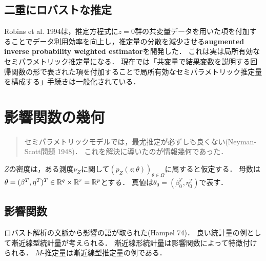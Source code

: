 \documentclass[uplatex,dvipdfmx]{jsreport}
\begin{document}
\section{二重にロバストな推定}

\begin{tcolorbox}[colframe=ForestGreen, colback=ForestGreen!10!white,breakable,colbacktitle=ForestGreen!40!white,coltitle=black,fonttitle=\bfseries\sffamily,
title=]
    Robins et al. 1994は，推定方程式に$z=0$群の共変量データを用いた項を付加することでデータ利用効率を向上し，推定量の分散を減少させる\textbf{augmented inverse probability weighted estimator}を開発した．
    これは実は局所有効なセミパラメトリック推定量になる．
    現在では「共変量で結果変数を説明する回帰関数の形で表された項を付加することで局所有効なセミパラメトリック推定量を構成する」手続きは一般化されている．
\end{tcolorbox}

\chapter{影響関数の幾何}

\begin{quotation}
    セミパラメトリックモデルでは，最尤推定が必ずしも良くない(Neyman-Scott問題 1948)．
    これを解決に導いたのが情報幾何であった．
\end{quotation}

\begin{notation}
    $Z$の密度は，ある測度$\nu_Z$に関して$(p_Z(z;\theta))_{\theta\in\Omega}$に属すると仮定する．
    母数は$\theta=(\beta^T,\eta^T)^T\in\mathbb{R}^q\times\mathbb{R}^r=\mathbb{R}^p$とする．
    真値は$\theta_0=(\beta_0^T,\eta^T_0)$で表す．
\end{notation}

\section{影響関数}

\begin{tcolorbox}[colframe=ForestGreen, colback=ForestGreen!10!white,breakable,colbacktitle=ForestGreen!40!white,coltitle=black,fonttitle=\bfseries\sffamily,
title=]
    ロバスト解析の文脈から影響の語が取られた(Hampel 74)．
    良い統計量の例として漸近線型統計量が考えられる．
    漸近線形統計量は影響関数によって特徴付けられる．
    $M$-推定量は漸近線型推定量の例である．
\end{tcolorbox}
\end{document}
